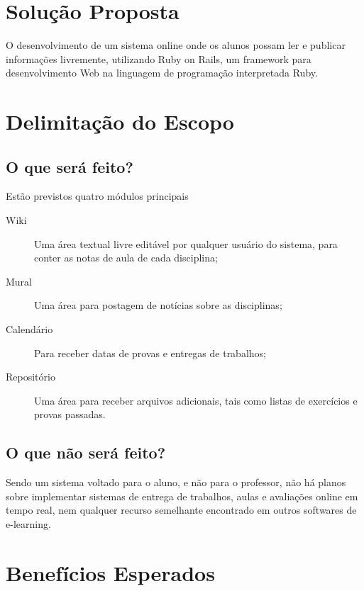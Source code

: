 \documentclass[11pt]{article}
\begin{document}
\section{Solução Proposta}

O desenvolvimento de um sistema online onde os alunos possam ler e publicar
informações livremente, utilizando Ruby on Rails, um framework para
desenvolvimento Web na linguagem de programação interpretada Ruby.



\section{Delimitação do Escopo}

\subsection{O que será feito?}

Estão previstos quatro módulos principais

\begin{description}
	\item[Wiki] Uma área textual livre editável por qualquer usuário do sistema, para conter as notas de aula de cada disciplina;
	\item[Mural] Uma área para postagem de notícias sobre as disciplinas;
	\item[Calendário] Para receber datas de provas e entregas de trabalhos;
	\item[Repositório] Uma área para receber arquivos adicionais, tais como listas de exercícios e provas passadas.
\end{description}

\subsection{O que não será feito?}

Sendo um sistema voltado para o aluno, e não para o professor, não há planos sobre
implementar sistemas de entrega de trabalhos, aulas e avaliações online em tempo
real, nem qualquer recurso semelhante encontrado em outros softwares de e-learning.


\section{ Benefícios Esperados}
\end{document}
